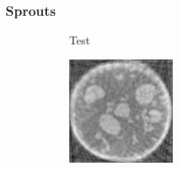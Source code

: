 \documentclass[journal]{IEEEtran}
\begin{document}
\subsubsection{\textbf{Sprouts}}
\label{Sec:sprouts_spatially_varying}
\begin{figure}[!h]
    \begin{subfigure}[b]{0.29\linewidth}
        \caption{Test}
     \end{subfigure}
\quad
    \begin{subfigure}[b]{0.3\linewidth}
        \includegraphics[width=\textwidth]{../images/sprouts/fdkIm.png}

\end{subfigure}
\end{figure}
\end{document}

